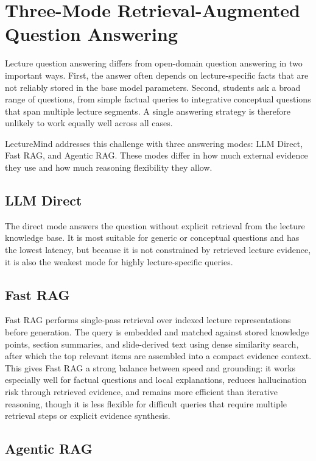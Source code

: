 \section{Three-Mode Retrieval-Augmented Question Answering}

Lecture question answering differs from open-domain question answering in two important ways. First, the answer often depends on lecture-specific facts that are not reliably stored in the base model parameters. Second, students ask a broad range of questions, from simple factual queries to integrative conceptual questions that span multiple lecture segments. A single answering strategy is therefore unlikely to work equally well across all cases.

LectureMind addresses this challenge with three answering modes: LLM Direct, Fast RAG, and Agentic RAG. These modes differ in how much external evidence they use and how much reasoning flexibility they allow.

\subsection{LLM Direct}

The direct mode answers the question without explicit retrieval from the lecture knowledge base. It is most suitable for generic or conceptual questions and has the lowest latency, but because it is not constrained by retrieved lecture evidence, it is also the weakest mode for highly lecture-specific queries.

\subsection{Fast RAG}

Fast RAG performs single-pass retrieval over indexed lecture representations before generation. The query is embedded and matched against stored knowledge points, section summaries, and slide-derived text using dense similarity search, after which the top relevant items are assembled into a compact evidence context. This gives Fast RAG a strong balance between speed and grounding: it works especially well for factual questions and local explanations, reduces hallucination risk through retrieved evidence, and remains more efficient than iterative reasoning, though it is less flexible for difficult queries that require multiple retrieval steps or explicit evidence synthesis.

\subsection{Agentic RAG}


